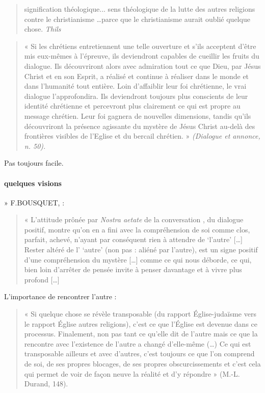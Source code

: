 \begin{quote}
    signification théologique... sens théologique de la lutte des autres religions contre le christianisme \ldots parce que le christianisme aurait oublié quelque chose. 
\textit{    Thils}
\end{quote}

\begin{quote}
    « Si les chrétiens entretiennent une telle ouverture et s’ils acceptent d’être mis eux-mêmes à l’épreuve, ils deviendront capables de cueillir les fruits du dialogue. Ils découvriront alors avec admiration tout ce que Dieu, par Jésus Christ et en son Esprit, a réalisé et continue à réaliser dans le monde et dans l’humanité tout entière. Loin d’affaiblir leur foi chrétienne, le vrai dialogue l’approfondira. Ils deviendront toujours plus conscients de leur identité chrétienne et percevront plus clairement ce qui est propre au message chrétien. Leur foi gagnera de nouvelles dimensions, tandis qu’ils découvriront la présence agissante du mystère de Jésus Christ au-delà des frontières visibles de l’Eglise et du bercail chrétien. » \textit{(Dialogue et annonce, n. 50). }
\end{quote}
Pas toujours facile. 
\paragraph{quelques visions}
» F.BOUSQUET,  : 
\begin{quote}
    « L’attitude prônée par \textit{Nostra aetate} de la conversation , du dialogue positif, montre qu’on en a fini avec la compréhension de soi comme clos, parfait, achevé, n’ayant par conséquent rien à attendre de ‘l’autre’ […] Rester altéré de l’ ‘autre’ (non pas : aliéné par l’autre), est un signe positif d’une compréhension du mystère […] comme ce qui nous déborde, ce qui, bien loin d’arrêter de pensée invite à penser davantage et à vivre plus profond […] 
\end{quote}
L'importance de rencontrer l'autre : 
\begin{quote}
    « Si quelque chose se révèle transposable (du rapport Église-judaïsme vers le rapport Église autres religions), c’est ce que l’Église est devenue dans ce processus. Finalement, non pas tant ce qu’elle dit de l’autre mais ce que la rencontre avec l’existence de l’autre a changé d’elle-même (\ldots) Ce qui est transposable ailleurs et avec d’autres, c’est toujours ce que l’on comprend de soi, de ses propres blocages, de ses propres obscurcissements et c’est cela qui permet de voir de façon neuve la réalité et d’y répondre » (M.-L. Durand, 148). \textbf{}
\end{quote}

